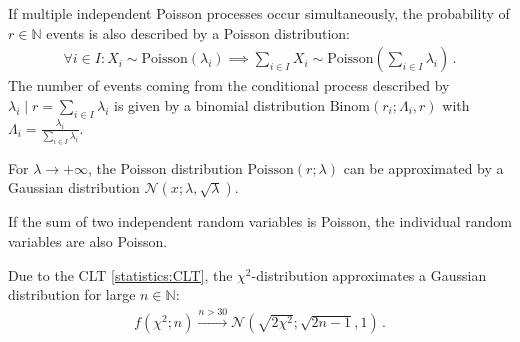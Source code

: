     \begin{property}
        If multiple independent Poisson processes occur simultaneously, the probability of $r\in\mathbb{N}$ events is also described by a Poisson distribution:
        \begin{gather}
            \forall i\in I:X_i\sim\mathrm{Poisson}(\lambda_i)\implies\sum_{i\in I}X_i\sim\mathrm{Poisson}\left(\sum_{i\in I}\lambda_i\right)\,.
        \end{gather}
        The number of events coming from the conditional process described by $\lambda_i\mid r=\sum_{i\in I}\lambda_i$ is given by a binomial distribution $\mathrm{Binom}(r_i;\Lambda_i,r)$ with $\Lambda_i = \frac{\lambda_i}{\sum_{i\in I}\lambda_i}$.
    \end{property}
    \begin{remark}
        For $\lambda\longrightarrow+\infty$, the Poisson distribution $\mathrm{Poisson}(r;\lambda)$ can be approximated by a Gaussian distribution $\mathcal{N}(x;\lambda,\sqrt{\lambda})$.
    \end{remark}

    \begin{theorem}[Raikov]
        If the sum of two independent random variables is Poisson, the individual random variables are also Poisson.
    \end{theorem}

    \begin{property}
        Due to the CLT \ref{statistics:CLT}, the $\chi^2$-distribution approximates a Gaussian distribution for large $n\in\mathbb{N}$:
        \begin{gather}
            f(\chi^2;n)\overset{n>30}{\longrightarrow}\mathcal{N}\left(\sqrt{2\chi^2};\sqrt{2n-1},1\right)\,.
        \end{gather}
    \end{property}


